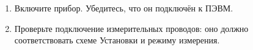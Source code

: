 \begin{enumerate}

\item Включите прибор. Убедитесь, что он подключён к ПЭВМ.
\item Проверьте подключение измерительных проводов: оно должно соответствовать схеме Установки и режиму измерения.

\end{enumerate}
